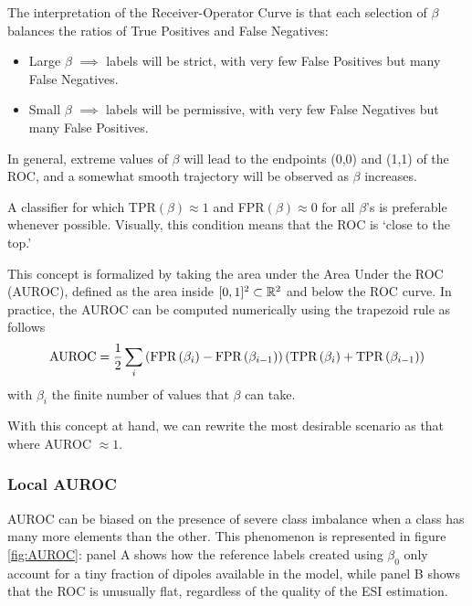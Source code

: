 The interpretation of the Receiver-Operator Curve is that each selection of $\beta$ balances the ratios of True Positives and False Negatives:
\begin{itemize}
\item 
Large $\beta$ $\implies$ labels will be strict, with very few False Positives but many False Negatives.
\item
Small $\beta$ $\implies$ labels will be permissive, with very few False Negatives but many False Positives.
\end{itemize}
In general, extreme values of $\beta$ will lead to the endpoints (0,0) and (1,1) of the ROC, and a somewhat smooth trajectory will be observed as $\beta$ increases.

A classifier for which TPR$(\beta)\approx 1$ and FPR$(\beta)\approx 0$ for all $\beta$'s is preferable whenever possible.
%
Visually, this condition means that the ROC is `close to the top.'

This concept is formalized by taking the area under the Area Under the ROC (AUROC), defined as the area inside $[0,1]^2\subset \mathbb{R}^2$ and below the ROC curve.
%
In practice, the AUROC can be computed numerically using the trapezoid rule as follows
\begin{equation}
\text{AUROC} =
\frac{1}{2}
\sum_{i}
\left(  \text{FPR}\left( \beta_i \right)-\text{FPR}\left( \beta_{i-1} \right)  \right)
\left(  \text{TPR}\left( \beta_i \right)+\text{TPR}\left( \beta_{i-1} \right)  \right)
\end{equation}
with $\beta_i$ the finite number of values that $\beta$ can take.


With this concept at hand, we can rewrite the most desirable scenario as that where AUROC $\approx 1$.

\subsubsection{Local AUROC}

AUROC can be biased on the presence of severe class imbalance when a class has many more elements than the other.
%
This phenomenon is represented in figure \ref{fig:AUROC}: panel A shows how the reference labels created using $\beta_0$ only account for a tiny fraction of dipoles available in the model, while panel B shows that the ROC is unusually flat, regardless of the quality of the ESI estimation.

